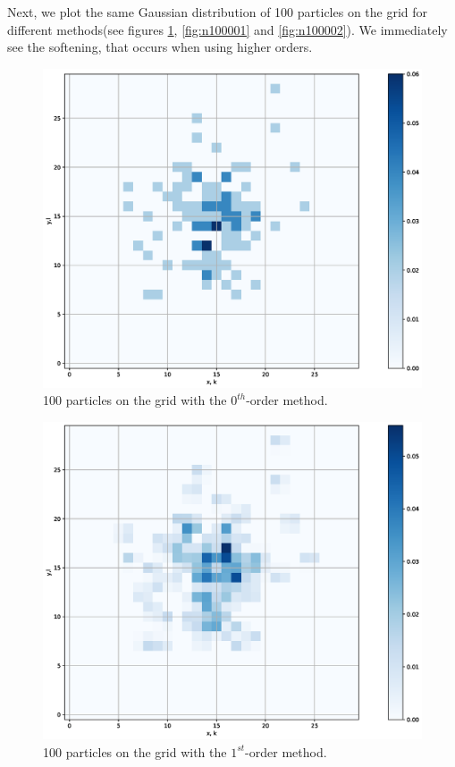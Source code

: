 \documentclass{scrartcl}
\begin{document}
Next, we plot the same Gaussian distribution of 100 particles on the grid for different methods(see figures \ref{fig:n1000}, \ref{fig:n100001} and \ref{fig:n100002}). We immediately see the softening, that occurs when using higher orders.
\begin{figure}[h]
	\centering
	\includegraphics[width=0.9\linewidth]{Plots/N100_0}
	\caption{100 particles on the grid with the \(0^{th}\)-order method.}
	\label{fig:n1000}
\end{figure}
\begin{figure}[h]
	\centering
	\includegraphics[width=0.9\linewidth]{Plots/N100_1}
	\caption{100 particles on the grid with the \(1^{st}\)-order method.}
	\label{fig:n1001}
\end{figure}
\end{document}

